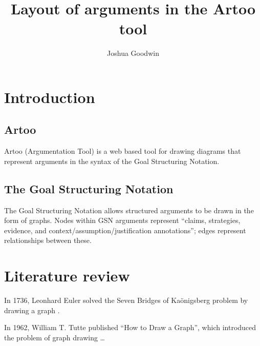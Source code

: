 \documentclass[authoryearcitations]{UoYCSproject}
\author{Joshua Goodwin}
\title{Layout of arguments in the Artoo tool}
\begin{document}
\maketitle




\chapter{Introduction}

\section{Artoo}

Artoo (Argumentation Tool) is a web based tool for drawing diagrams that represent arguments
in the syntax of the Goal Structuring Notation.

\section{The Goal Structuring Notation}

The Goal Structuring Notation allows structured arguments to be drawn in the form of graphs.
Nodes within GSN arguments represent ``claims, strategies, evidence, and context/assumption/justification annotations'';
edges represent relationships between these.


\chapter{Literature review}

In 1736, Leonhard Euler solved the Seven Bridges of Ka\"{o}nigsberg problem by drawing a graph \citep{ismail2009some}.

In 1962, William T. Tutte  published ``How to Draw a Graph'', which introduced the problem of graph drawing \ldots
\end{document}
